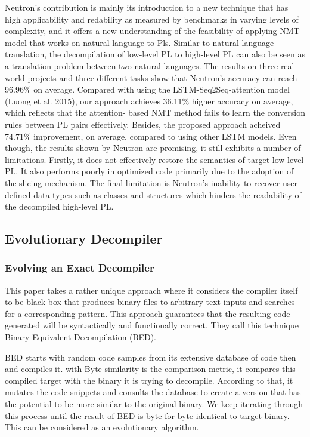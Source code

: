 \documentclass{article}
\begin{document}
Neutron’s contribution is mainly its introduction to a new technique that has high applicability and redability as measured by benchmarks in varying levels of complexity, and it offers a new understanding of the feasibility of applying NMT model that works on natural language to Pls. Similar to natural language translation, the decompilation of low-level PL to high-level PL can also be seen as a translation problem between two natural languages. The results on three real-world projects and three different tasks show that Neutron’s accuracy can reach 96.96\% on average. Compared with using the LSTM-Seq2Seq-attention model (Luong et al. 2015), our approach achieves 36.11\% higher accuracy on average, which reflects that the attention- based NMT method fails to learn the conversion rules between PL pairs effectively. Besides, the proposed approach acheived 74.71\% improvement, on average, compared to using other LSTM models. Even though, the results shown by Neutron are promising, it still exhibits a number of limitations. Firstly, it does not effectively restore the semantics of target low-level PL. It also performs poorly in optimized code primarily due to the adoption of the slicing mechanism. The final limitation is Neutron’s inability to recover user-defined data types such as classes and structures which hinders the readability of the decompiled high-level PL.


\subsection{Evolutionary Decompiler}

\subsubsection{Evolving an Exact Decompiler}

This paper takes a rather unique approach where it considers the compiler itself to be black box that produces binary files to arbitrary text inputs and searches for a corresponding pattern.
This approach guarantees that the resulting code generated will be syntactically and functionally correct.
They call this technique Binary Equivalent Decompilation (BED).

BED starts with random code samples from its extensive database of code then and compiles it.
with Byte-similarity is the comparison metric, it compares this compiled target with the binary it is trying to decompile.
According to that, it mutates the code snippets and consults the database to create a version that has the potential to be more similar to the original binary.
We keep iterating through this process until the result of BED is byte for byte identical to target binary.
This can be considered as an evolutionary algorithm.
\end{document}
